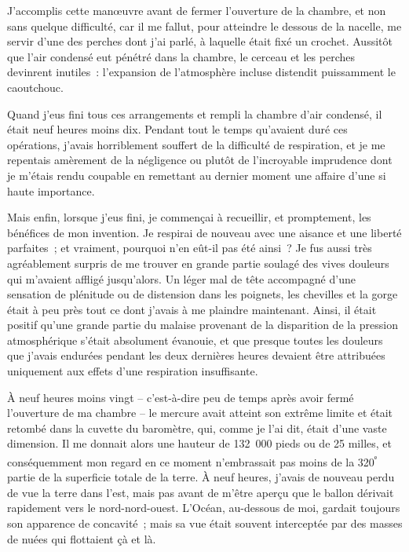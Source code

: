 \documentclass[french,twoside]{book} %
\begin{document}
J’accomplis cette manœuvre avant de fermer l’ouverture de la chambre, et non sans quelque difficulté, car il me fallut, pour atteindre le dessous de la nacelle, me servir d’une des perches dont j’ai parlé, à laquelle était fixé un crochet. Aussitôt que l’air condensé eut pénétré dans la chambre, le cerceau et les perches devinrent inutiles : l’expansion de l’atmosphère incluse distendit puissamment le caoutchouc.\par
Quand j’eus fini tous ces arrangements et rempli la chambre d’air condensé, il était neuf heures moins dix. Pendant tout le temps qu’avaient duré ces opérations, j’avais horriblement souffert de la difficulté de respiration, et je me repentais amèrement de la négligence ou plutôt de l’incroyable imprudence dont je m’étais rendu coupable en remettant au dernier moment une affaire d’une si haute importance.\par
Mais enfin, lorsque j’eus fini, je commençai à recueillir, et promptement, les bénéfices de mon invention. Je respirai de nouveau avec une aisance et une liberté parfaites ; et vraiment, pourquoi n’en eût-il pas été ainsi ? Je fus aussi très agréablement surpris de me trouver en grande partie soulagé des vives douleurs qui m’avaient affligé jusqu’alors. Un léger mal de tête accompagné d’une sensation de plénitude ou de distension dans les poignets, les chevilles et la gorge était à peu près tout ce dont j’avais à me plaindre maintenant. Ainsi, il était positif qu’une grande partie du malaise provenant de la disparition de la pression atmosphérique s’était absolument évanouie, et que presque toutes les douleurs que j’avais endurées pendant les deux dernières heures devaient être attribuées uniquement aux effets d’une respiration insuffisante.\par
À neuf heures moins vingt – c’est-à-dire peu de temps après avoir fermé l’ouverture de ma chambre – le mercure avait atteint son extrême limite et était retombé dans la cuvette du baromètre, qui, comme je l’ai dit, était d’une vaste dimension. Il me donnait alors une hauteur de 132 000 pieds ou de 25 milles, et conséquemment mon regard en ce moment n’embrassait pas moins de la 320\textsuperscript{ᵉ} partie de la superficie totale de la terre. À neuf heures, j’avais de nouveau perdu de vue la terre dans l’est, mais pas avant de m’être aperçu que le ballon dérivait rapidement vers le nord-nord-ouest. L’Océan, au-dessous de moi, gardait toujours son apparence de concavité ; mais sa vue était souvent interceptée par des masses de nuées qui flottaient çà et là.\par
\end{document}
